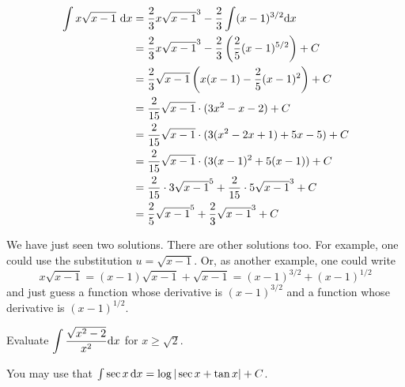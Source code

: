 \begin{solution}
\begin{description}
\begin{align*}
\int x\sqrt{x-1}~\mathrm{d}x&=\frac{2}{3}x\sqrt{x-1}^3 - \frac{2}{3}\int(x-1)^{3/2}\mathrm{d}x \\
&= \frac{2}{3}x\sqrt{x-1}^3 - \frac{2}{3}\left(\frac{2}{5}(x-1)^{5/2}\right)+C\\
&=\frac{2}{3}\sqrt{x-1}\left(x(x-1)-\frac{2}{5}(x-1)^2\right)+C\\
&=\frac{2}{15}\sqrt{x-1}\cdot(3x^2-x-2)+C\\
&=\frac{2}{15}\sqrt{x-1}\cdot(3(x^2-2x+1)+5x-5)+C\\
&=\frac{2}{15}\sqrt{x-1}\cdot(3(x-1)^2+5(x-1))+C\\
&=\frac{2}{15}\cdot 3\sqrt{x-1}^5 +\frac{2}{15}\cdot 5\sqrt{x-1}^3+C\\
&=\frac{2}{5}\sqrt{x-1}^5 +\frac{2}{3}\sqrt{x-1}^3+C
\end{align*}
\end{description}
We have just seen two solutions. There are other solutions too. For example, one could use the substitution $u=\sqrt{x-1}$. Or, as another example, one could write
\begin{equation*}
x\sqrt{x-1} = (x-1)\sqrt{x-1} +\sqrt{x-1} = (x-1)^{3/2} + (x-1)^{1/2}
\end{equation*}
and just guess a function whose derivative is $(x-1)^{3/2}$ and a function whose derivative is 
$(x-1)^{1/2}$. 
\begin{comment}
Using the substitution $u=\sqrt{x-1}$, $x=u^2+1$, $\dee{x}=2u\,\dee{u}$
\begin{align*}
\int x\sqrt{x-1}~\dee{x}&= \int(u^2+1)\,u\,2u\,\dee{u} \\
                        &= 2\int (u^4+u^2)\,\dee{u} \\
                        &=\tfrac{2}{5} u^5 +\tfrac{2}{3}u^3 + C \\
     &=\frac{2}{5}\sqrt{x-1}^5 +\frac{2}{3}\sqrt{x-1}^3+C
\end{align*} 
\end{comment}
\end{solution}







\begin{question} Evaluate
$\displaystyle\int \frac{\sqrt{x^2-2}}{x^2}\mathrm{d}x$ for $x\ge\sqrt{2}$.

You may use that  $\int \sec x\,\mathrm{d}x = \log|\sec x+\tan x| +C$.
\end{question}

